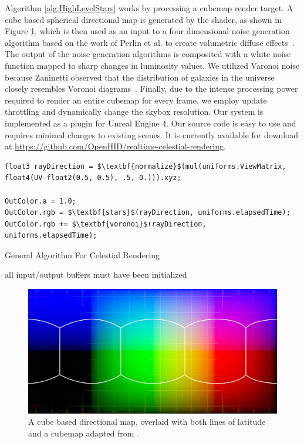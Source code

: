 \documentclass{vgtc}                          %
\begin{document}
Algorithm \ref{alg:HighLevelStars} works by processing a cubemap render target. A cube based spherical directional map is generated by the shader, as shown in Figure \ref{fig:cubemap}, which is then used as an input to a four dimensional noise generation algorithm based on the work of Perlin et al. to create volumetric diffuse effects~\cite{Perlin:2002}. The output of the noise generation algorithms is composited with a white noise function mapped to sharp changes in luminosity values. We utilized Varonoi noise because Zaninetti observed that the distribution of galaxies in the universe closely resembles Voronoi diagrams~\cite{Zaninetti:2013fa}.  Finally, due to the intense processing power required to render an entire cubemap for every frame, we employ update throttling and dynamically change the skybox resolution. Our system is implemented as a plugin for Unreal Engine 4. Our source code is easy to use and requires minimal changes to existing scenes. It is currently available for download at \url{https://github.com/OpenHID/realtime-celestial-rendering}. 


\begin{lstlisting}[caption={Fragment Shader for Celestial Rendering}, label={lst:shader}, float, belowskip=-2.5em]
float3 rayDirection = $\textbf{normalize}$(mul(uniforms.ViewMatrix, float4(UV-float2(0.5, 0.5), .5, 0.))).xyz;

OutColor.a = 1.0;
OutColor.rgb = $\textbf{stars}$(rayDirection, uniforms.elapsedTime);
OutColor.rgb += $\textbf{voronoi}$(rayDirection, uniforms.elapsedTime);
\end{lstlisting}

\begin{algorithm}[tbh]                      %
	\caption{General Algorithm For Celestial Rendering}          %
	\label{alg:HighLevelStars}                           %
	\begin{algorithmic}[1]                    %
    \Ensure all input/output buffers must have been initialized
	\EndFor	
	\end{algorithmic}
\end{algorithm}
\begin{figure}[ht]
  \centering
  \includegraphics[width=0.8\columnwidth]{../images/directioncubemap}
  \caption{A cube based directional map, overlaid with both lines of latitude and a cubemap adapted from \cite{EpicCube2016}.}
  \label{fig:cubemap}
\end{figure}
\end{document}
